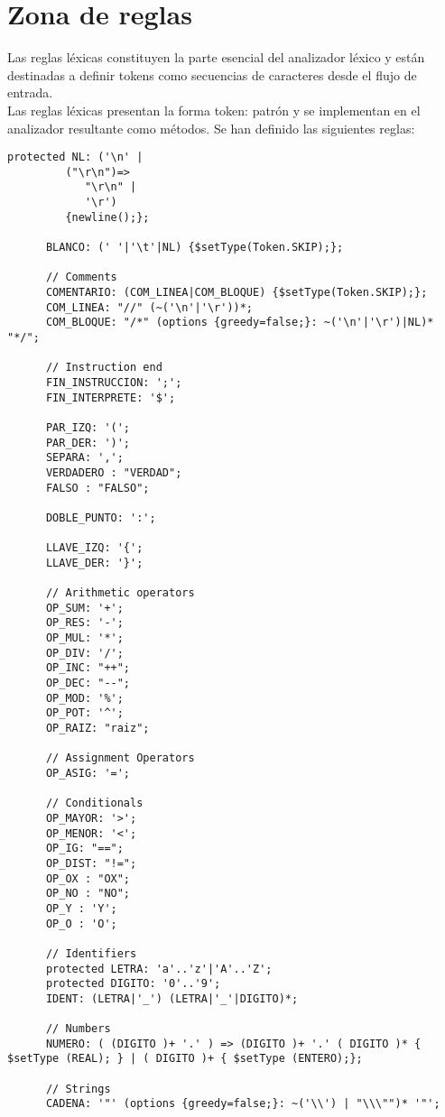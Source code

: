    \section{Zona de reglas}
   Las reglas léxicas constituyen la parte esencial del analizador léxico y están destinadas a definir tokens como secuencias de
   caracteres desde el flujo de entrada.\\ 
  
   Las reglas léxicas presentan la forma token: patrón y se implementan en el analizador resultante como métodos. Se han definido
   las siguientes reglas: 
   \begin{lstlisting}[mathescape=false]
      protected NL: ('\n' |
         ("\r\n")=>
            "\r\n" |
            '\r')
         {newline();};

      BLANCO: (' '|'\t'|NL) {$setType(Token.SKIP);};

      // Comments
      COMENTARIO: (COM_LINEA|COM_BLOQUE) {$setType(Token.SKIP);};
      COM_LINEA: "//" (~('\n'|'\r'))*;
      COM_BLOQUE: "/*" (options {greedy=false;}: ~('\n'|'\r')|NL)* "*/";

      // Instruction end
      FIN_INSTRUCCION: ';';
      FIN_INTERPRETE: '$';
      
      PAR_IZQ: '(';
      PAR_DER: ')';
      SEPARA: ',';
      VERDADERO : "VERDAD";
      FALSO : "FALSO";

      DOBLE_PUNTO: ':'; 
      
      LLAVE_IZQ: '{';
      LLAVE_DER: '}';
      
      // Arithmetic operators
      OP_SUM: '+';
      OP_RES: '-';
      OP_MUL: '*';
      OP_DIV: '/';
      OP_INC: "++";
      OP_DEC: "--";
      OP_MOD: '%';
      OP_POT: '^';
      OP_RAIZ: "raiz";
      
      // Assignment Operators
      OP_ASIG: '=';
         
      // Conditionals
      OP_MAYOR: '>';
      OP_MENOR: '<';
      OP_IG: "==";
      OP_DIST: "!=";
      OP_OX : "OX";
      OP_NO : "NO"; 
      OP_Y : 'Y';
      OP_O : 'O';

      // Identifiers
      protected LETRA: 'a'..'z'|'A'..'Z';
      protected DIGITO: '0'..'9';
      IDENT: (LETRA|'_') (LETRA|'_'|DIGITO)*;

      // Numbers
      NUMERO: ( (DIGITO )+ '.' ) => (DIGITO )+ '.' ( DIGITO )* { $setType (REAL); } | ( DIGITO )+ { $setType (ENTERO);};
            
      // Strings
      CADENA: '"' (options {greedy=false;}: ~('\\') | "\\\"")* '"';
   \end{lstlisting}

